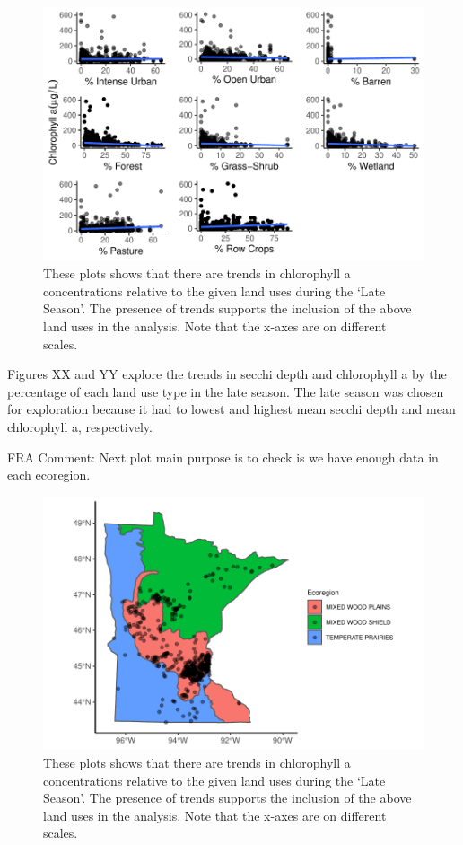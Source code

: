 \documentclass[12pt,]{article}
\begin{document}
\begin{figure}
\centering
\includegraphics{Bollt_Greif_Raby_Roth_Draft_1115_files/figure-latex/unnamed-chunk-7-1.pdf}
\caption{These plots shows that there are trends in chlorophyll a
concentrations relative to the given land uses during the `Late Season'.
The presence of trends supports the inclusion of the above land uses in
the analysis. Note that the x-axes are on different scales.}
\end{figure}

Figures XX and YY explore the trends in secchi depth and chlorophyll a
by the percentage of each land use type in the late season. The late
season was chosen for exploration because it had to lowest and highest
mean secchi depth and mean chlorophyll a, respectively.

FRA Comment: Next plot main purpose is to check is we have enough data
in each ecoregion.

\begin{figure}
\centering
\includegraphics{Bollt_Greif_Raby_Roth_Draft_1115_files/figure-latex/summary.for.early.season-1.pdf}
\caption{These plots shows that there are trends in chlorophyll a
concentrations relative to the given land uses during the `Late Season'.
The presence of trends supports the inclusion of the above land uses in
the analysis. Note that the x-axes are on different scales.}
\end{figure}
\end{document}
